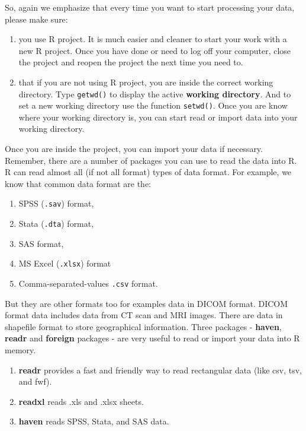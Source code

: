 \documentclass[
]{book}
\providecommand{\tightlist}{%
  \setlength{\itemsep}{0pt}\setlength{\parskip}{0pt}}
\begin{document}
So, again we emphasize that every time you want to start processing your data, please make sure:

\begin{enumerate}
\def\labelenumi{\arabic{enumi}.}
\tightlist
\item
  you use R project. It is much easier and cleaner to start your work with a new R project. Once you have done or need to log off your computer, close the project and reopen the project the next time you need to.\\
\item
  that if you are not using R project, you are inside the correct working directory. Type \texttt{getwd()} to display the active \textbf{working directory}. And to set a new working directory use the function \texttt{setwd()}. Once you are know where your working directory is, you can start read or import data into your working directory.
\end{enumerate}

Once you are inside the project, you can import your data if necessary. Remember, there are a number of packages you can use to read the data into R. R can read almost all (if not all format) types of data format. For example, we know that common data format are the:

\begin{enumerate}
\def\labelenumi{\arabic{enumi}.}
\tightlist
\item
  SPSS (\texttt{.sav}) format,
\item
  Stata (\texttt{.dta}) format,
\item
  SAS format,
\item
  MS Excel (\texttt{.xlsx}) format
\item
  Comma-separated-values \texttt{.csv} format.
\end{enumerate}

But they are other formats too for examples data in DICOM format. DICOM format data includes data from CT scan and MRI images. There are data in shapefile format to store geographical information. Three packages - \textbf{haven}, \textbf{readr} and \textbf{foreign} packages - are very useful to read or import your data into R memory.

\begin{enumerate}
\def\labelenumi{\arabic{enumi}.}
\tightlist
\item
  \textbf{readr} provides a fast and friendly way to read rectangular data (like csv, tsv, and fwf).
\item
  \textbf{readxl} reads .xls and .xlsx sheets.
\item
  \textbf{haven} reads SPSS, Stata, and SAS data.
\end{enumerate}
\end{document}
